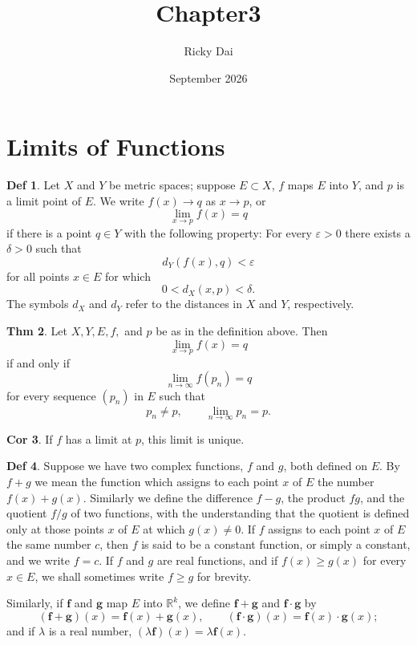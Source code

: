 \documentclass{article}
\title{Chapter3}
\author{Ricky Dai}
\date{September 2026}
\theoremstyle{definition}
\newtheorem{definition}{Def}
\newtheorem{theorem}[definition]{Thm}
\newtheorem{corollary}[definition]{Cor}
\begin{document}
\maketitle
\section{Limits of Functions}
\begin{definition}
    Let $X$ and $Y$ be metric spaces; suppose $E\subset X$, $f$ maps $E$ into $Y$, and $p$ is a limit point of $E$. We write $f(x)\to q$ as $x\to p$, or
    \[
    \lim_{x\to p}f(x)=q
    \]
    if there is a point $q\in Y$ with the following property: For every $\varepsilon>0$ there exists a $\delta>0$ such that
    \[
    d_Y(f(x),q)<\varepsilon
    \]
    for all points $x\in E$ for which 
    \[
    0<d_X(x,p)<\delta.
    \]
    The symbols $d_X$ and $d_Y$ refer to the distances in $X$ and $Y$, respectively.
\end{definition}
\begin{theorem}
    Let $X,Y,E,f,$ and $p$ be as in the definition above. Then
    \[
    \lim_{x\to p}f(x)=q
    \]
    if and only if
    \[
    \lim_{n\to\infty} f(p_n)=q
    \]
    for every sequence $(p_n)$ in $E$ such that 
    \[
    p_n\neq p,\qquad \lim_{n\to\infty}p_n=p.
    \]
\end{theorem}
\begin{corollary}
    If $f$ has a limit at $p$, this limit is unique.
\end{corollary}
\begin{definition}
    Suppose we have two complex functions, $f$ and $g$, both defined on $E$. By $f+g$ we mean the function which assigns to each point $x$ of $E$ the number $f(x)+g(x)$. Similarly we define the difference $f-g$, the product $fg$, and the quotient $f/g$ of two functions, with the understanding that the quotient is defined only at those points $x$ of $E$ at which $g(x)\neq 0$. If $f$ assigns to each point $x$ of $E$ the same number $c$, then $f$ is said to be a constant function, or simply a constant, and we write $f=c$. If $f$ and $g$ are real functions, and if $f(x)\geq g(x)$ for every $x\in E$, we shall sometimes write $f\geq g$ for brevity.\par
    Similarly, if $\mathbf{f}$ and $\mathbf{g}$ map $E$ into $\mathbb{R}^k$, we define $\mathbf{f}+\mathbf{g}$ and $\mathbf{f}\cdot\mathbf{g}$ by
    \[
    (\mathbf{f}+\mathbf{g})(x)=\mathbf{f}(x)+\mathbf{g}(x), \qquad (\mathbf{f}\cdot\mathbf{g})(x)=\mathbf{f}(x)\cdot\mathbf{g}(x);
    \]
    and if $\lambda$ is a real number, $(\lambda\mathbf{f})(x)=\lambda\mathbf{f}(x)$.
\end{definition}
\end{document}
